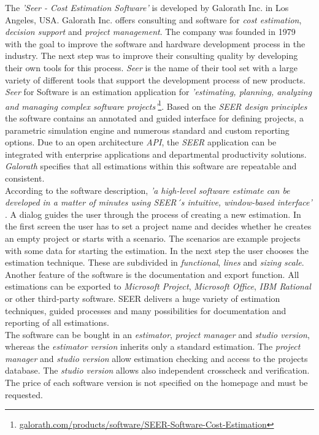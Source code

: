 The \textit{'Seer - Cost Estimation Software'} is developed by Galorath Inc. in Los Angeles, USA. Galorath Inc. offers consulting and software for \textit{cost estimation}, \textit{decision support} and \textit{project management}. The company was founded in 1979 with the goal to improve the software and hardware development process in the industry. The next step was to improve their consulting quality by developing their own tools for this process. \textit{Seer} is the name of their tool set with a large variety of different tools that support the development process of new products.
\\
\textit{Seer} for Software is an estimation application for \textit{'estimating, planning, analyzing and managing complex software projects'}\footnote{\url{galorath.com/products/software/SEER-Software-Cost-Estimation}}. Based on the \textit{SEER design principles} the software contains an annotated and guided interface for defining projects, a parametric simulation engine and numerous standard and custom reporting options. Due to an open architecture \textit{API}, the \textit{SEER} application can be integrated with enterprise applications and departmental productivity solutions. \textit{Galorath} specifies that all estimations within this software are repeatable and consistent.
\\
According to the software description, \textit{'a high-level software estimate can be developed in a matter of minutes using SEER´s intuitive, window-based interface'} \cite{pricesystems}. A dialog guides the user through the process of creating a new estimation. In the first screen the user has to set a project name and decides whether he creates an empty project or starts with a scenario. The scenarios are example projects with some data for starting the estimation. In the next step the user chooses the estimation technique. These are subdivided in \textit{functional}, \textit{lines} and \textit{sizing scale}. Another feature of the software is the documentation and export function. All estimations can be exported to \textit{Microsoft Project}, \textit{Microsoft Office}, \textit{IBM Rational} or other third-party software. SEER delivers a huge variety of estimation techniques, guided processes and many possibilities for documentation and reporting of all estimations.
\\
The software can be bought in an \textit{estimator}, \textit{project manager} and \textit{studio version}, whereas the \textit{estimator version} inherits only a standard estimation. The \textit{project manager} and \textit{studio version} allow estimation checking and access to the projects database. The \textit{studio version} allows also independent crosscheck and verification. The price of each software version is not specified on the homepage and must be requested.

